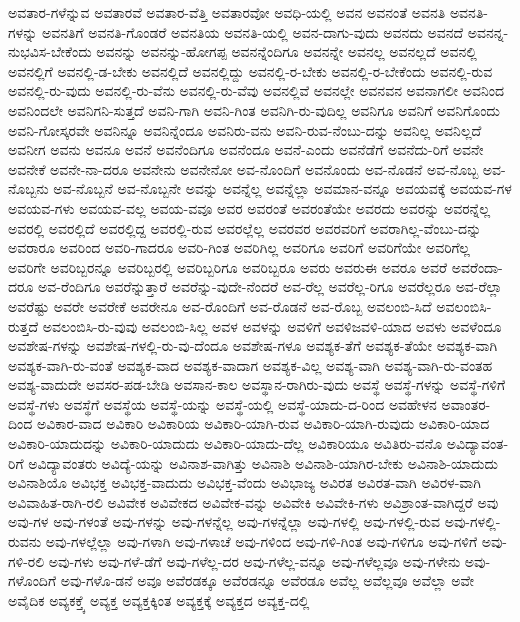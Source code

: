 {ಅವತಾರ-ಗಳೆನ್ನುವ
ಅವತಾರವೆ
ಅವತಾರ-ವೆತ್ತಿ
ಅವತಾರವೋ
ಅವಧಿ-ಯಲ್ಲಿ
ಅವನ
ಅವನಂತೆ
ಅವನತಿ
ಅವನತಿ-ಗಳನ್ನು
ಅವನತಿಗೆ
ಅವನತಿ-ಗೊಂಡರೆ
ಅವನತಿಯ
ಅವನತಿ-ಯಲ್ಲಿ
ಅವನ-ದಾಗು-ವುದು
ಅವನದು
ಅವನದೆ
ಅವನನ್ನ-ನುಭವಿಸ-ಬೇಕೆಂದು
ಅವನನ್ನು
ಅವನನ್ನು-ಹೋಗಪ್ಪ
ಅವನನ್ನೆಂದಿಗೂ
ಅವನನ್ನೇ
ಅವನಲ್ಲ
ಅವನಲ್ಲದೆ
ಅವನಲ್ಲಿ
ಅವನಲ್ಲಿಗೆ
ಅವನಲ್ಲಿ-ಡ-ಬೇಕು
ಅವನಲ್ಲಿದೆ
ಅವನಲ್ಲಿದ್ದು
ಅವನಲ್ಲಿ-ರ-ಬೇಕು
ಅವನಲ್ಲಿ-ರ-ಬೇಕೆಂದು
ಅವನಲ್ಲಿ-ರುವ
ಅವನಲ್ಲಿ-ರು-ವುದು
ಅವನಲ್ಲಿ-ರು-ವೆನು
ಅವನಲ್ಲಿ-ರು-ವೆವು
ಅವನಲ್ಲಿವೆ
ಅವನಲ್ಲೇ
ಅವನವನ
ಅವನಾಗಲೀ
ಅವನಿಂದ
ಅವನಿಂದಲೇ
ಅವನಿಗನಿ-ಸುತ್ತದೆ
ಅವನಿ-ಗಾಗಿ
ಅವನಿ-ಗಿಂತ
ಅವನಿಗಿ-ರು-ವುದಿಲ್ಲ
ಅವನಿಗೂ
ಅವನಿಗೆ
ಅವನಿಗೊಂದು
ಅವನಿ-ಗೋಸ್ಕರವೇ
ಅವನಿನ್ನೂ
ಅವನಿನ್ನೆಂದೂ
ಅವನಿರು-ವನು
ಅವನಿ-ರುವ-ನೆಂಬು-ದನ್ನು
ಅವನಿಲ್ಲ
ಅವನಿಲ್ಲದೆ
ಅವನೀಗ
ಅವನು
ಅವನೂ
ಅವನೆ
ಅವನೆಂದಿಗೂ
ಅವನೆಂದೂ
ಅವನೆ-ಎಂದು
ಅವನೆಡೆಗೆ
ಅವನೆದು-ರಿಗೆ
ಅವನೇ
ಅವನೇಕೆ
ಅವನೇ-ನಾ-ದರೂ
ಅವನೇನು
ಅವನೇನೋ
ಅವ-ನೊಂದಿಗೆ
ಅವನೊಂದು
ಅವ-ನೊಡನೆ
ಅವ-ನೊಬ್ಬ
ಅವ-ನೊಬ್ಬನು
ಅವ-ನೊಬ್ಬನೆ
ಅವ-ನೊಬ್ಬನೇ
ಅವನ್ನು
ಅವನ್ನೆಲ್ಲ
ಅವನ್ನೆಲ್ಲಾ
ಅವಮಾನ-ವನ್ನೂ
ಅವಯವಕ್ಕೆ
ಅವಯವ-ಗಳ
ಅವಯವ-ಗಳು
ಅವಯವ-ವಲ್ಲ
ಅವಯ-ವವೂ
ಅವರ
ಅವರಂತೆ
ಅವರಂತೆಯೇ
ಅವರದು
ಅವರನ್ನು
ಅವರನ್ನೆಲ್ಲ
ಅವರಲ್ಲಿ
ಅವರಲ್ಲಿದೆ
ಅವರಲ್ಲಿದ್ದ
ಅವರಲ್ಲಿ-ರುವ
ಅವರಲ್ಲೆಲ್ಲ
ಅವರವರ
ಅವರವರಿಗೆ
ಅವರಾಗಿಲ್ಲ-ವೆಂಬು-ದನ್ನು
ಅವರಾರೂ
ಅವರಿಂದ
ಅವರಿ-ಗಾದರೂ
ಅವರಿ-ಗಿಂತ
ಅವರಿಗಿಲ್ಲ
ಅವರಿಗೂ
ಅವರಿಗೆ
ಅವರಿಗೆಯೇ
ಅವರಿಗೆಲ್ಲ
ಅವರಿಗೇ
ಅವರಿಬ್ಬರನ್ನೂ
ಅವರಿಬ್ಬರಲ್ಲಿ
ಅವರಿಬ್ಬರಿಗೂ
ಅವರಿಬ್ಬರೂ
ಅವರು
ಅವರುಈ
ಅವರೂ
ಅವರೆ
ಅವರೆಂದಾ-ದರೂ
ಅವ-ರೆಂದಿಗೂ
ಅವರೆನ್ನುತ್ತಾರೆ
ಅವರೆನ್ನು-ವುದೇ-ನೆಂದರೆ
ಅವ-ರೆಲ್ಲ
ಅವರೆಲ್ಲ-ರಿಗೂ
ಅವರೆಲ್ಲರೂ
ಅವ-ರೆಲ್ಲಾ
ಅವರೆಷ್ಟು
ಅವರೇ
ಅವರೇಕೆ
ಅವರೇನೂ
ಅವ-ರೊಂದಿಗೆ
ಅವ-ರೊಡನೆ
ಅವ-ರೊಬ್ಬ
ಅವಲಂಬಿ-ಸಿದೆ
ಅವಲಂಬಿಸಿ-ರುತ್ತದೆ
ಅವಲಂಬಿಸಿ-ರು-ವುವು
ಅವಲಂಬಿ-ಸಿಲ್ಲ
ಅವಳ
ಅವಳನ್ನು
ಅವಳಿಗೆ
ಅವಳಿಜವಳಿ-ಯಾದ
ಅವಳು
ಅವಳೆಂದೂ
ಅವಶೇಷ-ಗಳನ್ನು
ಅವಶೇಷ-ಗಳಲ್ಲಿ-ರು-ವು-ದೆಂದೂ
ಅವಶೇಷ-ಗಳೂ
ಅವಶ್ಯಕ-ತೆಗೆ
ಅವಶ್ಯಕ-ತೆಯೇ
ಅವಶ್ಯಕ-ವಾಗಿ
ಅವಶ್ಯಕ-ವಾಗಿ-ರು-ವಂತೆ
ಅವಶ್ಯಕ-ವಾದ
ಅವಶ್ಯಕ-ವಾದಾಗ
ಅವಶ್ಯಕ-ವಿಲ್ಲ
ಅವಶ್ಯ-ವಾಗಿ
ಅವಶ್ಯ-ವಾಗಿ-ರು-ವಂತಹ
ಅವಶ್ಯ-ವಾದುದೇ
ಅವಸರ-ಪಡ-ಬೇಡಿ
ಅವಸಾನ-ಕಾಲ
ಅವಸ್ಥಾನ-ರಾಗಿರು-ವುದು
ಅವಸ್ಥೆ
ಅವಸ್ಥೆ-ಗಳನ್ನು
ಅವಸ್ಥೆ-ಗಳಿಗೆ
ಅವಸ್ಥೆ-ಗಳು
ಅವಸ್ಥೆಗೆ
ಅವಸ್ಥೆಯ
ಅವಸ್ಥೆ-ಯನ್ನು
ಅವಸ್ಥೆ-ಯಲ್ಲಿ
ಅವಸ್ಥೆ-ಯಾದು-ದ-ರಿಂದ
ಅವಹೇಳನ
ಅವಾಂತರ-ದಿಂದ
ಅವಿಕಾರ-ವಾದ
ಅವಿಕಾರಿ
ಅವಿಕಾರಿಯ
ಅವಿಕಾರಿ-ಯಾಗಿ-ರುವ
ಅವಿಕಾರಿ-ಯಾಗಿ-ರುವುದು
ಅವಿಕಾರಿ-ಯಾದ
ಅವಿಕಾರಿ-ಯಾದುದನ್ನು
ಅವಿಕಾರಿ-ಯಾದುದು
ಅವಿಕಾರಿ-ಯಾದು-ದೆಲ್ಲ
ಅವಿಕಾರಿಯೂ
ಅವಿತಿರು-ವನೊ
ಅವಿದ್ಯಾವಂತ-ರಿಗೆ
ಅವಿದ್ಯಾವಂತರು
ಅವಿದ್ಯೆ-ಯನ್ನು
ಅವಿನಾಶ-ವಾಗಿತ್ತು
ಅವಿನಾಶಿ
ಅವಿನಾಶಿ-ಯಾಗಿರ-ಬೇಕು
ಅವಿನಾಶಿ-ಯಾದುದು
ಅವಿನಾಶಿಯೊ
ಅವಿಭಕ್ತ
ಅವಿಭಕ್ತ-ವಾದುದು
ಅವಿಭಕ್ತ-ವೆಂದು
ಅವಿಭಾಜ್ಯ
ಅವಿರತ
ಅವಿರತ-ವಾಗಿ
ಅವಿರಳ-ವಾಗಿ
ಅವಿವಾಹಿತ-ರಾಗಿ-ರಲಿ
ಅವಿವೇಕ
ಅವಿವೇಕದ
ಅವಿವೇಕ-ವನ್ನು
ಅವಿವೇಕಿ
ಅವಿವೇಕಿ-ಗಳು
ಅವಿಶ್ರಾಂತ-ವಾಗಿದ್ದರೆ
ಅವು
ಅವು-ಗಳ
ಅವು-ಗಳಂತೆ
ಅವು-ಗಳನ್ನು
ಅವು-ಗಳನ್ನೆಲ್ಲ
ಅವು-ಗಳನ್ನೆಲ್ಲಾ
ಅವು-ಗಳಲ್ಲಿ
ಅವು-ಗಳಲ್ಲಿ-ರುವ
ಅವು-ಗಳಲ್ಲಿ-ರುವನು
ಅವು-ಗಳಲ್ಲೆಲ್ಲಾ
ಅವು-ಗಳಾಗಿ
ಅವು-ಗಳಾಚೆ
ಅವು-ಗಳಿಂದ
ಅವು-ಗಳಿ-ಗಿಂತ
ಅವು-ಗಳಿಗೂ
ಅವು-ಗಳಿಗೆ
ಅವು-ಗಳಿ-ರಲಿ
ಅವು-ಗಳು
ಅವು-ಗಳೆ-ಡೆಗೆ
ಅವು-ಗಳೆಲ್ಲ-ದರ
ಅವು-ಗಳೆಲ್ಲ-ವನ್ನೂ
ಅವು-ಗಳೆಲ್ಲವೂ
ಅವು-ಗಳೇನು
ಅವು-ಗಳೊಂದಿಗೆ
ಅವು-ಗಳೊ-ಡನೆ
ಅವೂ
ಅವೆರಡಕ್ಕೂ
ಅವೆರಡನ್ನೂ
ಅವೆರಡೂ
ಅವೆಲ್ಲ
ಅವೆಲ್ಲವೂ
ಅವೆಲ್ಲಾ
ಅವೇ
ಅವೈದಿಕ
ಅವ್ಯಕಕ್ತ್ಕೆ
ಅವ್ಯಕ್ತ
ಅವ್ಯಕ್ತಕ್ಕಿಂತ
ಅವ್ಯಕ್ತಕ್ಕೆ
ಅವ್ಯಕ್ತದ
ಅವ್ಯಕ್ತ-ದಲ್ಲಿ
}
